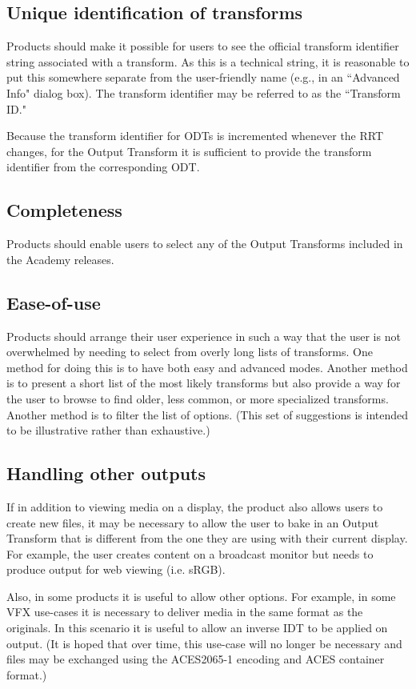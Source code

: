 \subsection{Unique identification of transforms} \label{sec:uid2}
Products should make it possible for users to see the official transform identifier string associated with a transform. As this is a technical string, it is reasonable to put this somewhere separate from the user-friendly name (e.g., in an ``Advanced Info" dialog box). The transform identifier may be referred to as the ``Transform ID."

Because the transform identifier for ODTs is incremented whenever the RRT changes, for the Output Transform it is sufficient to provide the transform identifier from the corresponding ODT.

\subsection{Completeness}
Products should enable users to select any of the Output Transforms included in the Academy releases.

\subsection{Ease-of-use}
Products should arrange their user experience in such a way that the user is not overwhelmed by needing to select from overly long lists of transforms. One method for doing this is to have both easy and advanced modes. Another method is to present a short list of the most likely transforms but also provide a way for the user to browse to find older, less common, or more specialized transforms. Another method is to filter the list of options. (This set of suggestions is intended to be illustrative rather than exhaustive.)

\subsection{Handling other outputs}
If in addition to viewing media on a display, the product also allows users to create new files, it may be necessary to allow the user to bake in an Output Transform that is different from the one they are using with their current display. For example, the user creates content on a broadcast monitor but needs to produce output for web viewing (i.e. sRGB).

Also, in some products it is useful to allow other options. For example, in some VFX use-cases it is necessary to deliver media in the same format as the originals. In this scenario it is useful to allow an inverse IDT to be applied on output. (It is hoped that over time, this use-case will no longer be necessary and files may be exchanged using the ACES2065-1 encoding and ACES container format.)

